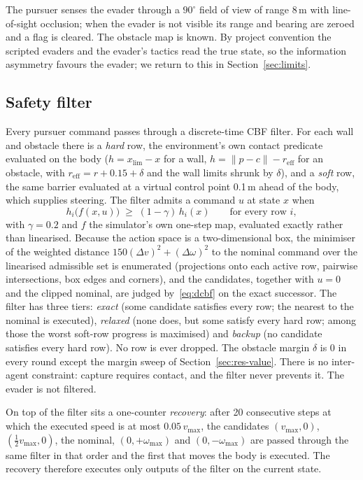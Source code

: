 \documentclass[conference]{IEEEtran}
\begin{document}
The pursuer senses the evader through a $90^\circ$ field of view of range 8\,m with line-of-sight occlusion; when the evader is not visible its range and bearing are zeroed and a flag is cleared. The obstacle map is known. By project convention the scripted evaders and the evader's tactics read the true state, so the information asymmetry favours the evader; we return to this in Section~\ref{sec:limits}.

\subsection{Safety filter}
\label{sec:filter}
Every pursuer command passes through a discrete-time CBF filter. For each wall and obstacle there is a \emph{hard} row, the environment's own contact predicate evaluated on the body ($h = x_{\lim}-x$ for a wall, $h=\lVert p-c\rVert-r_{\mathrm{eff}}$ for an obstacle, with $r_{\mathrm{eff}} = r+0.15+\delta$ and the wall limits shrunk by $\delta$), and a \emph{soft} row, the same barrier evaluated at a virtual control point 0.1\,m ahead of the body, which supplies steering. The filter admits a command $u$ at state $x$ when
\begin{equation}
h_i\!\big(f(x,u)\big) \;\ge\; (1-\gamma)\,h_i(x)\qquad\text{for every row } i,
\label{eq:dcbf}
\end{equation}
with $\gamma=0.2$ and $f$ the simulator's own one-step map, evaluated exactly rather than linearised. Because the action space is a two-dimensional box, the minimiser of the weighted distance $150(\Delta v)^2+(\Delta\omega)^2$ to the nominal command over the linearised admissible set is enumerated (projections onto each active row, pairwise intersections, box edges and corners), and the candidates, together with $u=0$ and the clipped nominal, are judged by~\eqref{eq:dcbf} on the exact successor. The filter has three tiers: \emph{exact} (some candidate satisfies every row; the nearest to the nominal is executed), \emph{relaxed} (none does, but some satisfy every hard row; among those the worst soft-row progress is maximised) and \emph{backup} (no candidate satisfies every hard row). No row is ever dropped. The obstacle margin $\delta$ is 0 in every round except the margin sweep of Section~\ref{sec:res-value}. There is no inter-agent constraint: capture requires contact, and the filter never prevents it. The evader is not filtered.

On top of the filter sits a one-counter \emph{recovery}: after 20 consecutive steps at which the executed speed is at most $0.05\,v_{\max}$, the candidates $(v_{\max},0)$, $(\tfrac12 v_{\max},0)$, the nominal, $(0,+\omega_{\max})$ and $(0,-\omega_{\max})$ are passed through the same filter in that order and the first that moves the body is executed. The recovery therefore executes only outputs of the filter on the current state.
\end{document}
